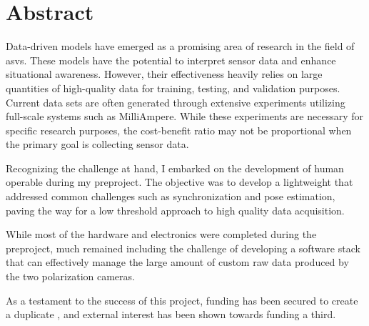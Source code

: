 \chapter*{Abstract}

Data-driven models have emerged as a promising area of research in the field of \glspl{asv}.
These models have the potential to interpret sensor data and enhance situational awareness.
However, their effectiveness heavily relies on large quantities of high-quality data for training, testing, and validation purposes.
Current data sets are often generated through extensive experiments utilizing full-scale systems such as MilliAmpere.
While these experiments are necessary for specific research purposes, the cost-benefit ratio may not be proportional when the primary goal is collecting sensor data.

Recognizing the challenge at hand, I embarked on the development of human operable \sr during my preproject.
The objective was to develop a lightweight \sr that addressed common challenges such as synchronization and pose estimation, paving the way for a low threshold approach to high quality data acquisition.

While most of the hardware and electronics were completed during the preproject, much remained including the challenge of developing a software stack that can effectively manage the large amount of custom raw data produced by the two polarization cameras.

As a testament to the success of this project, funding has been secured to create a duplicate \sr, and external interest has been shown towards funding a third.

